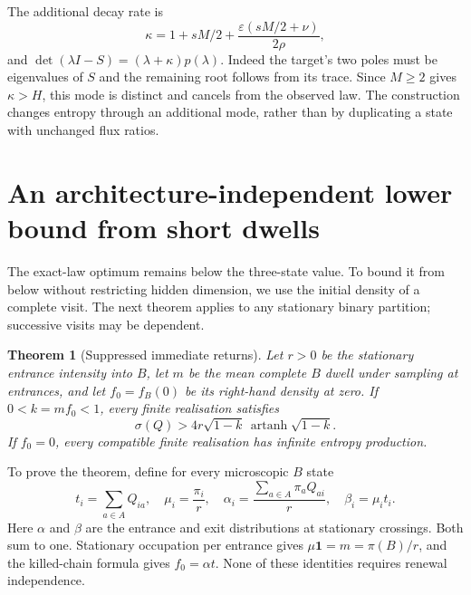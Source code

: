 \documentclass[11pt,a4paper]{article}
\newtheorem{theorem}{Theorem}
\theoremstyle{remark}\newtheorem{remark}[theorem]{Remark}
\newcommand{\one}{\mathbf 1}
\newcommand{\atanh}{\operatorname{artanh}}
\begin{document}
The additional decay rate is
\begin{equation}
 \kappa=1+sM/2+\frac{\varepsilon(sM/2+\nu )}{2\rho},
\end{equation}
and $\det(\lambda I-S)=(\lambda+\kappa)p(\lambda)$.
Indeed the target's two poles must be eigenvalues of $S$ and the remaining
root follows from its trace. Since $M\geq2$ gives $\kappa>H$, this mode
is distinct and cancels from the observed law. The construction changes
entropy through an additional mode, rather than by duplicating a state
with unchanged flux ratios.


\section{An architecture-independent lower bound from short dwells}
\label{sec:boundary}

The exact-law optimum remains below the three-state value. To bound it from
below without restricting hidden dimension, we use the initial density of a
complete visit. The next theorem applies to any stationary binary partition;
successive visits may be dependent.

\begin{theorem}[Suppressed immediate returns]\label{thm:boundary}
Let $r>0$ be the stationary entrance intensity into $B$, let $m$ be the mean
complete $B$ dwell under sampling at entrances, and let $f_0=f_B(0)$ be its
right-hand density at zero. If $0<k=mf_0<1$, every finite realisation satisfies
\begin{equation}\label{eq:boundarybound}
 \sigma(Q)>4r\sqrt{1-k}\,\atanh\sqrt{1-k}.
\end{equation}
If $f_0=0$, every compatible finite realisation has infinite entropy production.
\end{theorem}

To prove the theorem, define for every microscopic $B$ state
\begin{equation}\label{eq:palm}
 t_i=\sum_{a\in A}Q_{ia},\quad \mu_i=\frac{\pi_i}{r},\quad
 \alpha_i=\frac{\sum_{a\in A}\pi_aQ_{ai}}r,\quad \beta_i=\mu_it_i.
\end{equation}
Here $\alpha$ and $\beta$ are the entrance and exit distributions at
stationary crossings. Both sum to one. Stationary occupation per entrance
gives $\mu\one=m=\pi(B)/r$, and the killed-chain formula gives
$f_0=\alpha t$. None of these identities requires renewal independence.
\end{document}
